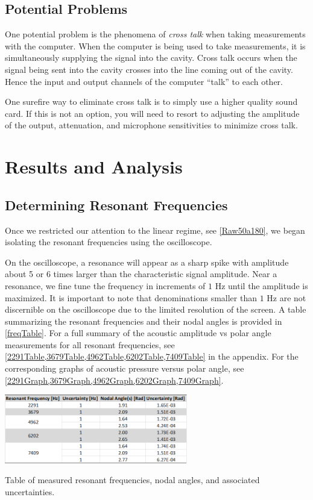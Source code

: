 \documentclass[12pt]{article}
\begin{document}
	\subsection{Potential Problems}
	One potential problem is the phenomena of \emph{cross talk} when taking measurements with the computer. When the computer is being used to take measurements, it is simultaneously supplying the signal into the cavity. Cross talk occurs when the signal being sent into the cavity crosses into the line coming out of the cavity. Hence the input and output channels of the computer ``talk'' to each other. 
	
	One surefire way to eliminate cross talk is to simply use a higher quality sound card. If this is not an option, you will need to resort to adjusting the amplitude of the output, attenuation, and microphone sensitivities to minimize cross talk.
	
	
	
	
\section{Results and Analysis}
	
	\subsection{Determining Resonant Frequencies}
	Once we restricted our attention to the linear regime, see \cref{Raw50a180}, we began isolating the resonant frequencies using the oscilloscope.
	
	On the oscilloscope, a resonance will appear as a sharp spike with amplitude about 5 or 6 times larger than the characteristic signal amplitude. Near a resonance, we fine tune the frequency in increments of $1$ Hz until the amplitude is maximized. It is important to note that denominations smaller than $1$ Hz are not discernible on the oscilloscope due to the limited resolution of the screen. A table summarizing the resonant frequencies and their nodal angles is provided in \cref{freqTable}. For a full summary of the acoustic amplitude vs polar angle measurements for all resonant frequencies, see \cref{2291Table,3679Table,4962Table,6202Table,7409Table} in the appendix. For the corresponding graphs of acoustic pressure versus polar angle, see \cref{2291Graph,3679Graph,4962Graph,6202Graph,7409Graph}.
	
	\begin{table}[H]
		\captionsetup{justification = centering}
		\centering
		\includegraphics[width=0.6\textwidth]{Tables/ResTable.png}
		\caption{Table of measured resonant frequencies, nodal angles, and associated uncertainties.}
		\label{freqTable}
	\end{table}
\end{document}
